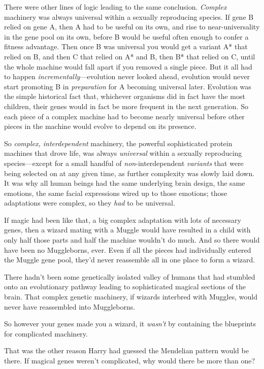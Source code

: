 There were other lines of logic leading to the same conclusion. \emph{Complex}
machinery was always universal within a sexually reproducing species. If gene B
relied on gene A, then A had to be useful on its own, and rise to
near-universality in the gene pool on its own, before B would be useful often
enough to confer a fitness advantage. Then once B was universal you would get a
variant A* that relied on B, and then C that relied on A* and B, then B* that
relied on C, until the whole machine would fall apart if you removed a single
piece. But it all had to happen \emph{incrementally}---evolution never looked
ahead, evolution would never start promoting B in \emph{preparation} for A
becoming universal later. Evolution was the simple historical fact that,
whichever organisms did in fact have the most children, their genes would in
fact be more frequent in the next generation. So each piece of a complex
machine had to become nearly universal before other pieces in the machine would
evolve to depend on its presence.

So \emph{complex, interdependent} machinery, the powerful sophisticated protein
machines that drove life, was always \emph{universal} within a sexually
reproducing species---except for a small handful of \emph{non}-interdependent
\emph{variants} that were being selected on at any given time, as further
complexity was slowly laid down. It was why all human beings had the same
underlying brain design, the same emotions, the same facial expressions wired
up to those emotions; those adaptations were complex, so they \emph{had} to be
universal.

If magic had been like that, a big complex adaptation with lots of necessary
genes, then a wizard mating with a Muggle would have resulted in a child with
only half those parts and half the machine wouldn't do much. And so there would
have been no Muggleborns, ever. Even if all the pieces had individually entered
the Muggle gene pool, they'd never reassemble all in one place to form a
wizard.

There hadn't been some genetically isolated valley of humans that had stumbled
onto an evolutionary pathway leading to sophisticated magical sections of the
brain. That complex genetic machinery, if wizards interbred with Muggles, would
never have reassembled into Muggleborns.

So however your genes made you a wizard, it \emph{wasn't} by containing the
blueprints for complicated machinery.

That was the other reason Harry had guessed the Mendelian pattern would be
there. If magical genes weren't complicated, why would there be more than one?

